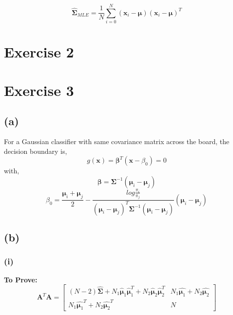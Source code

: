 \documentclass[11pt]{article}
\begin{document}
$$\hat{\pmb{\Sigma}}_{MLE}=\frac{1}{N}\sum_{i=0}^{N}(\pmb{x}_i-\pmb{\mu})(\pmb{x}_i-\pmb{\mu})^T$$

\section*{Exercise 2}

\pagebreak
\section*{Exercise 3}
\subsection*{(a)}
For a Gaussian classifier with same covariance matrix across the board, the decision boundary is,
$$g(\pmb{x}) = \pmb{\beta}^T(\pmb{x}-\beta_0)=0$$
with,
$$\pmb{\beta} = \pmb{\Sigma}^{-1}(\pmb{\mu}_i-\pmb{\mu}_j)$$
$$\beta_0=\frac{\pmb{\mu}_i+\pmb{\mu}_j}{2}-\frac{log\frac{\pi_i}{\pi_j}}{(\pmb{\mu}_i-\pmb{\mu}_j)^T\pmb{\Sigma}^{-1}(\pmb{\mu}_i-\pmb{\mu}_j)}(\pmb{\mu}_i-\pmb{\mu}_j)$$

\subsection*{(b)}
\subsubsection*{(i)}
\noindent \textbf{To Prove:}
$$\pmb{A}^T\pmb{A}=\begin{bmatrix}
(N-2)\hat{\pmb{\Sigma}}+N_1\hat{\pmb{\mu}}_1\hat{\pmb{\mu}}_1^T+N_2\hat{\pmb{\mu}}_2\hat{\pmb{\mu}}_2^T & N_1\hat{\pmb{\mu}_1}+N_2\hat{\pmb{\mu}_2}\\
N_1\hat{\pmb{\mu}_1}^T+N_2\hat{\pmb{\mu}_2}^T & N
\end{bmatrix}$$
\end{document}
